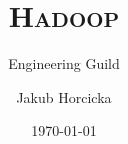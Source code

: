 \documentclass[xcolor=dvipsnames]{beamer}
\author{Jakub Horcicka}
\title{\textsc{Hadoop}}
\subtitle{Engineering Guild}
\date{\today}
\begin{document}
 
  \begin{frame}
    \titlepage
  \end{frame}

  
  
\end{document}

